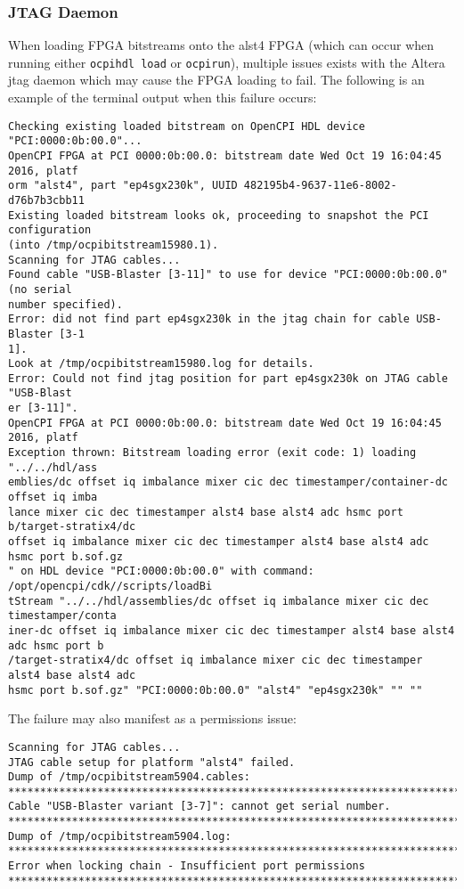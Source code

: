 \documentclass{article}
\newcommand{\terminaloutput}[1]{\texttt{#1}}
\begin{document}
\subsubsection*{JTAG Daemon}
When loading FPGA bitstreams onto the alst4 FPGA (which can occur when running either \terminaloutput{ocpihdl load} or \terminaloutput{ocpirun}), multiple issues exists with the Altera jtag daemon which may cause the FPGA loading to fail. The following is an example of the terminal output when this failure occurs:
\begin{lstlisting}
Checking existing loaded bitstream on OpenCPI HDL device "PCI:0000:0b:00.0"...
OpenCPI FPGA at PCI 0000:0b:00.0: bitstream date Wed Oct 19 16:04:45 2016, platf
orm "alst4", part "ep4sgx230k", UUID 482195b4-9637-11e6-8002-d76b7b3cbb11
Existing loaded bitstream looks ok, proceeding to snapshot the PCI configuration
(into /tmp/ocpibitstream15980.1).
Scanning for JTAG cables...
Found cable "USB-Blaster [3-11]" to use for device "PCI:0000:0b:00.0" (no serial
number specified).
Error: did not find part ep4sgx230k in the jtag chain for cable USB-Blaster [3-1
1].
Look at /tmp/ocpibitstream15980.log for details.
Error: Could not find jtag position for part ep4sgx230k on JTAG cable "USB-Blast
er [3-11]".
OpenCPI FPGA at PCI 0000:0b:00.0: bitstream date Wed Oct 19 16:04:45 2016, platf
Exception thrown: Bitstream loading error (exit code: 1) loading "../../hdl/ass
emblies/dc offset iq imbalance mixer cic dec timestamper/container-dc offset iq imba
lance mixer cic dec timestamper alst4 base alst4 adc hsmc port b/target-stratix4/dc
offset iq imbalance mixer cic dec timestamper alst4 base alst4 adc hsmc port b.sof.gz
" on HDL device "PCI:0000:0b:00.0" with command: /opt/opencpi/cdk//scripts/loadBi
tStream "../../hdl/assemblies/dc offset iq imbalance mixer cic dec timestamper/conta
iner-dc offset iq imbalance mixer cic dec timestamper alst4 base alst4 adc hsmc port b
/target-stratix4/dc offset iq imbalance mixer cic dec timestamper alst4 base alst4 adc
hsmc port b.sof.gz" "PCI:0000:0b:00.0" "alst4" "ep4sgx230k" "" ""
\end{lstlisting}
The failure may also manifest as a permissions issue:
\begin{lstlisting}
Scanning for JTAG cables...
JTAG cable setup for platform "alst4" failed.
Dump of /tmp/ocpibitstream5904.cables:
********************************************************************************
Cable "USB-Blaster variant [3-7]": cannot get serial number.
********************************************************************************
Dump of /tmp/ocpibitstream5904.log:
********************************************************************************
Error when locking chain - Insufficient port permissions
********************************************************************************
\end{lstlisting}
\end{document}

